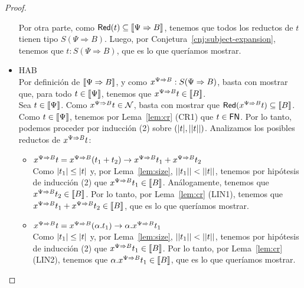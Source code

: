 \begin{proof}
\begin{itemize}
        Por otra parte, como \( \mathsf{Red} (t) \subseteq \llbracket\Psi \Rightarrow B\rrbracket \), tenemos que todos los reductos de \( t \) tienen tipo \( S(\Psi \Rightarrow B) \). Luego, por Conjetura~\ref{cnj:subject-expansion}, tenemos que \( t : S(\Psi \Rightarrow B) \), que es lo que queríamos mostrar.
      \item HAB
        \\ Por definición de \( \llbracket\Psi \Rightarrow B\rrbracket \), y como \( x^{\Psi \Rightarrow B} : S(\Psi \Rightarrow B) \), basta con mostrar que, para todo \( t \in \llbracket\Psi\rrbracket \), tenemos que \( x^{\Psi \Rightarrow B} t \in \llbracket B\rrbracket \).
        \\ Sea \( t \in \llbracket\Psi\rrbracket \). Como \( x^{\Psi \Rightarrow B} t \in \mathcal{N} \), basta con mostrar que \( \mathsf{Red} (x^{\Psi \Rightarrow B} t) \subseteq \llbracket B\rrbracket \). Como \( t \in \llbracket\Psi\rrbracket \), tenemos por Lema~\ref{lem:cr} (CR1) que \( t \in \mathsf{FN} \). Por lo tanto, podemos proceder por inducción (2) sobre \( (|t|, ||t||) \). Analizamos los posibles reductos de \( x^{\Psi \Rightarrow B} t \):
        \begin{itemize}
          \item \( x^{\Psi \Rightarrow B} t = x^{\Psi \Rightarrow B} (t_1 + t_2) \rightarrow x^{\Psi \Rightarrow B} t_1 + x^{\Psi \Rightarrow B} t_2 \)
            \\ Como \( |t_1| \leq |t| \) y, por Lema~\ref{lem:size}, \( ||t_1|| < ||t|| \), tenemos por hipótesis de inducción (2) que \( x^{\Psi \Rightarrow B} t_1 \in \llbracket B\rrbracket \). Análogamente, tenemos que \( x^{\Psi \Rightarrow B} t_2 \in \llbracket B\rrbracket \). Por lo tanto, por Lema~\ref{lem:cr} (LIN1), tenemos que \( x^{\Psi \Rightarrow B} t_1 + x^{\Psi \Rightarrow B} t_2 \in \llbracket B\rrbracket \), que es lo que queríamos mostrar.
          \item \( x^{\Psi \Rightarrow B} t = x^{\Psi \Rightarrow B} (\alpha . t_1) \rightarrow \alpha . x^{\Psi \Rightarrow B} t_1 \)
            \\ Como \( |t_1| \leq |t| \) y, por Lema~\ref{lem:size}, \( ||t_1|| < ||t|| \), tenemos por hipótesis de inducción (2) que \( x^{\Psi \Rightarrow B} t_1 \in \llbracket B\rrbracket \). Por lo tanto, por Lema~\ref{lem:cr} (LIN2), tenemos que \( \alpha . x^{\Psi \Rightarrow B} t_1 \in \llbracket B\rrbracket \), que es lo que queríamos mostrar.

\end{itemize}
\end{itemize}
\end{proof}

